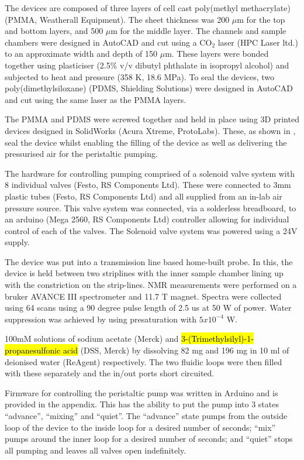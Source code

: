 The devices are composed of three layers of cell cast poly(methyl methacrylate) (PMMA,
Weatherall Equipment). The sheet thickness was 200 $\mu$m for the top and bottom layers, and 500 $\mu$m for
the middle layer. The channels and sample chambers were designed in
AutoCAD and cut using a CO$_2$ laser (HPC Laser ltd.) to an approximate width and depth
of 150 $\mu$m. These layers were bonded together using plasticiser (2.5\% v/v dibutyl
phthalate in isopropyl alcohol) and subjected to heat and pressure (358 K, 18.6 MPa).
To seal the devices, two poly(dimethylsiloxane) (PDMS, Shielding Solutions) were
designed in AutoCAD and cut using the same laser as the PMMA layers.

The PMMA and PDMS were screwed together and held in place using 3D printed devices
designed in SolidWorks (Acura Xtreme, ProtoLabs). These, as shown in , seal the
device whilst enabling the filling of the device as well as delivering the pressurised
air for the peristaltic pumping.

The hardware for controlling pumping comprised of a solenoid valve system with 8
individual valves (Festo, RS Components Ltd). These were connected to 3mm plastic tubes
(Festo, RS Components Ltd) and all supplied from an in-lab air pressure source. This valve system was connected,
via a solderless breadboard, to an arduino (Mega 2560, RS Components Ltd) controller allowing for
individual control of each of the valves. The Solenoid valve system was powered using
a 24V supply.

The device was put into a transmission line based home-built probe. In this, the
device is held between two striplines with the inner sample chamber lining up with the
constriction on the strip-lines. NMR measurements were performed on a bruker AVANCE
III spectrometer and 11.7 T magnet. Spectra were collected using 64 scans using a 90
degree pulse length of 2.5 us at 50 W of power. Water suppression was achieved by
using presaturation with $5x10^{-4}$ W.

100mM solutions of sodium acetate (Merck) and \hl{3-(Trimethylsilyl)-1-propanesulfonic
acid} (DSS, Merck) by dissolving 82 mg and 196 mg in 10 ml of deionised water
(ReAgent)
respectively. The two fluidic loops were then filled with these separately and the
in/out ports short circuited.

Firmware for controlling the peristaltic pump was written in Arduino and is provided in the appendix.
This has the ability to put the pump into 3 states
“advance”, “mixing” and “quiet”. The “advance” state pumps from the outside loop of
the device to the inside loop for a desired number of seconds; “mix” pumps around the
inner loop for a desired number of seconds; and “quiet” stops all pumping and leaves
all valves open indefinitely.


